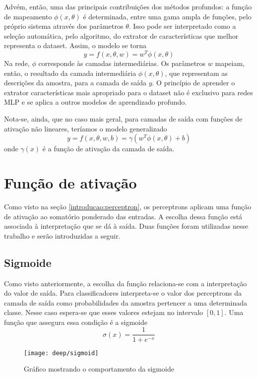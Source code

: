 Advém, então, uma das principais contribuições dos métodos profundos: a função de mapeamento $\phi(x,\theta)$ é determinada, entre uma gama ampla de funções, pelo próprio sistema através dos parâmetros $\theta$. Isso pode ser interpretado como a seleção automática, pelo algoritmo, do extrator de características que melhor representa o dataset. Assim, o modelo se torna 
\begin{equation}
y=f(x,\theta,w) = w^T\phi(x,\theta)
\end{equation}
Na rede, $\phi$ corresponde às camadas intermediárias. Os parâmetros $w$ mapeiam, então, o resultado da camada intermediária $\phi(x,\theta)$, que representam as descrições da amostra, para a camada de saída $y$. O princípio de aprender o extrator características mais apropriado para o dataset não é exclusivo para redes MLP e se aplica a outros modelos de aprendizado profundo.

Nota-se, ainda, que no caso mais geral, para camadas de saída com funções de ativação não lineares, teríamos o modelo generalizado
\begin{equation}
y=f(x,\theta,w,b) = \gamma(w^T\phi(x,\theta)+b)
\end{equation}
onde $\gamma(x)$ é a função de ativação da camada de saída.

\section{Função de ativação}
Como visto na seção \ref{introducao:perceptron}, os perceptrons aplicam uma função de ativação ao somatório ponderado das entradas. A escolha dessa função está associada à interpretação que se dá à saída. Duas funções foram utilizadas nesse trabalho e serão introduzidas a seguir.

\subsection{Sigmoide}
Como visto anteriormente, a escolha da função relaciona-se com a interpretação do valor de saída. Para classificadores interpreta-se o valor dos perceptrons da camada de saída como probabilidades da amostra pertencer a uma determinada classe. Nesse caso espera-se que esses valores estejam no intervalo $[0,1]$. Uma função que assegura essa condição é a sigmoide
\begin{equation}
	\label{eq:sigm}
	\sigma(x) = \frac{1}{1+e^{-x}}
\end{equation}

\begin{figure}[h]
\centering
\texttt{[image: deep/sigmoid]}
\caption{Gráfico mostrando o comportamento da sigmoide}
\label{fig:sigmoid}
\end{figure}


